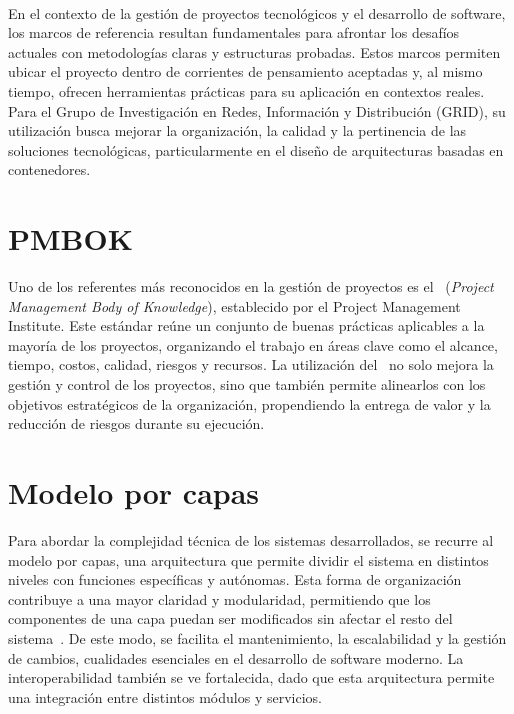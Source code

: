 \label{cap:marcoTeorico}
\mbox{}\\
En el contexto de la gestión de proyectos tecnológicos y el desarrollo de software, los marcos de referencia resultan fundamentales para afrontar los desafíos actuales con metodologías claras y estructuras probadas. Estos marcos permiten ubicar el proyecto dentro de corrientes de pensamiento aceptadas y, al mismo tiempo, ofrecen herramientas prácticas para su aplicación en contextos reales. Para el Grupo de Investigación en Redes, Información y Distribución (GRID), su utilización busca mejorar la organización, la calidad y la pertinencia de las soluciones tecnológicas, particularmente en el diseño de arquitecturas basadas en contenedores.

\section{PMBOK}
\noindent
Uno de los referentes más reconocidos en la gestión de proyectos es el \PMBOK\ (\textit{Project Management Body of Knowledge}), establecido por el Project Management Institute. Este estándar reúne un conjunto de buenas prácticas aplicables a la mayoría de los proyectos, organizando el trabajo en áreas clave como el alcance, tiempo, costos, calidad, riesgos y recursos\citep{project2017guia}. La utilización del \PMBOK\ no solo mejora la gestión y control de los proyectos, sino que también permite alinearlos con los objetivos estratégicos de la organización, propendiendo la entrega de valor y la reducción de riesgos durante su ejecución\citep{Monday2022}.

\section{Modelo por capas}
\noindent
Para abordar la complejidad técnica de los sistemas desarrollados, se recurre al modelo por capas, una arquitectura que permite dividir el sistema en distintos niveles con funciones específicas y autónomas. Esta forma de organización contribuye a una mayor claridad y modularidad, permitiendo que los componentes de una capa puedan ser modificados sin afectar el resto del sistema~\citep{Spray2023}. De este modo, se facilita el mantenimiento, la escalabilidad y la gestión de cambios, cualidades esenciales en el desarrollo de software moderno. La interoperabilidad también se ve fortalecida, dado que esta arquitectura permite una integración entre distintos módulos y servicios.

